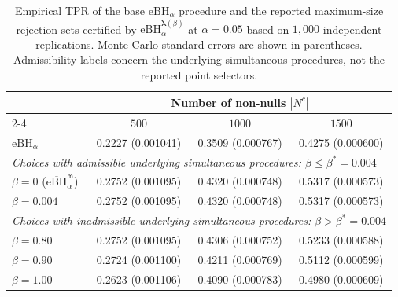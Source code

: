 \begin{table}[t]
\centering
\caption{Empirical TPR of the base $\mathrm{eBH}_\alpha$ procedure and the reported maximum-size rejection sets certified by $\overline{\mathrm{eBH}}_{\alpha}^{\bm{\lambda}(\beta)}$ at $\alpha=0.05$ based on $1{,}000$ independent replications. Monte Carlo standard errors are shown in parentheses. Admissibility labels concern the underlying simultaneous procedures, not the reported point selectors.}
\label{tab:constant-terms-tpr}
\footnotesize
\begingroup
\setlength{\tabcolsep}{6pt}
\renewcommand{\arraystretch}{1.2}
\begin{tabularx}{\textwidth}{@{}Xccc@{}}
\toprule
& \multicolumn{3}{c}{Number of non-nulls $|N^c|$} \\
\cmidrule(lr){2-4}
& $500$ & $1000$ & $1500$ \\
\midrule
\addlinespace[2pt]
$\mathrm{eBH}_\alpha$ & 0.2227 (0.001041) & 0.3509 (0.000767) & 0.4275 (0.000600) \\
\midrule
\multicolumn{4}{l}{\emph{Choices with admissible underlying simultaneous procedures: $\beta \leq \beta^*=0.004$}}\\
\addlinespace[2pt]
$\beta=0$ ($\overline{\mathrm{eBH}}_\alpha^{\mathsf{m}}$) & 0.2752 (0.001095) & 0.4320 (0.000748) & 0.5317 (0.000573) \\
$\beta=0.004$ & 0.2752 (0.001095) & 0.4320 (0.000748) & 0.5317 (0.000573) \\
\midrule
\multicolumn{4}{l}{\emph{Choices with inadmissible underlying simultaneous procedures: $\beta > \beta^*=0.004$}}\\
\addlinespace[2pt]
$\beta=0.80$ & 0.2752 (0.001095) & 0.4306 (0.000752) & 0.5233 (0.000588) \\
$\beta=0.90$ & 0.2724 (0.001100) & 0.4211 (0.000769) & 0.5112 (0.000599) \\
$\beta=1.00$ & 0.2623 (0.001106) & 0.4090 (0.000783) & 0.4980 (0.000609) \\
\bottomrule
\end{tabularx}
\endgroup
\end{table}
